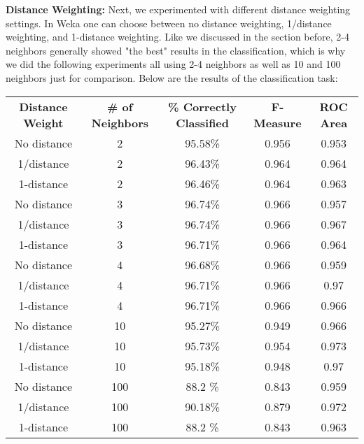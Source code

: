 \documentclass{article}
\begin{document}
\textbf{Distance Weighting:}
Next, we experimented with different distance weighting settings. In Weka one can choose between no distance weighting, 1/distance weighting, and 1-distance weighting. Like we discussed in the section before, 2-4 neighbors generally showed "the best" results in the classification, which is why we did the following experiments all using 2-4 neighbors as well as 10 and 100 neighbors just for comparison. Below are the results of the classification task:


\begin{center}
\begin{tabular}{c | c | c | c | c}
\textbf{Distance Weight} & \textbf{\# of Neighbors} & \textbf{\% Correctly Classified} & \textbf{F-Measure} & \textbf{ROC Area}\\
No distance & 2   & 95.58\% & 0.956 & 0.953\\
1/distance  & 2   & 96.43\% & 0.964 & 0.964\\
1-distance  & 2   & 96.46\% & 0.964 & 0.963\\
No distance & 3   & 96.74\% & 0.966 & 0.957\\
1/distance  & 3   & 96.74\% & 0.966 & 0.967\\
1-distance  & 3   & 96.71\% & 0.966 & 0.964\\
No distance & 4   & 96.68\% & 0.966 & 0.959\\
1/distance  & 4   & 96.71\% & 0.966 & 0.97\\
1-distance  & 4   & 96.71\% & 0.966 & 0.966\\
No distance & 10  & 95.27\% & 0.949 & 0.966\\
1/distance  & 10  & 95.73\% & 0.954 & 0.973\\
1-distance  & 10  & 95.18\% & 0.948 & 0.97\\
No distance & 100 & 88.2 \% & 0.843 & 0.959\\
1/distance  & 100 & 90.18\% & 0.879 & 0.972\\
1-distance  & 100 & 88.2 \% & 0.843 & 0.963\\
\end{tabular}
\end{center}
\end{document}
